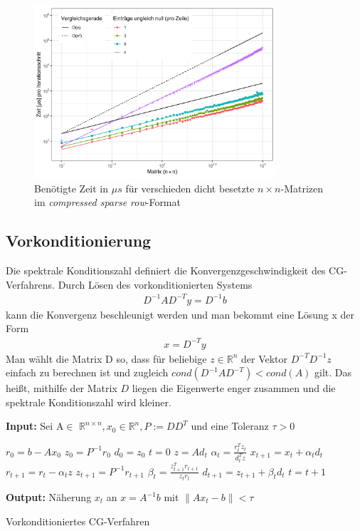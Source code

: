 \documentclass[12pt,a4paper]{scrartcl}
\numberwithin{equation}{section}
\numberwithin{myalgctr}{section}
\numberwithin{mytheoremctr}{subsection}
\numberwithin{mykorollarctr}{subsection}
\numberwithin{mylemmactr}{subsection}
\numberwithin{mybeispielctr}{subsection}
\newcommand\norm[1]{\left\lVert#1\right\rVert}
\begin{document}
	\begin{figure}[H]
		\begin{center}
			\includegraphics[width=0.8\textwidth]{../plots/cg-sparsity-sparse.png}
		\end{center}
		\caption{Ben\"otigte Zeit in $\mu s$ f\"ur verschieden dicht besetzte $n\times n$-Matrizen im \textit{compressed sparse row}-Format}
		\label{fig:zeitcg-sparse}	
	\end{figure}
	
	\subsection{Vorkonditionierung}
	Die spektrale Konditionszahl definiert die Konvergenzgeschwindigkeit des CG-Verfahrens. Durch Lösen des vorkonditionierten Systems
	\begin{align*}
		D^{-1}AD^{-T}y = D^{-1}b
	\end{align*}
	kann die Konvergenz beschleunigt werden und man bekommt eine Lösung x der Form 
	\begin{align*}
		x = D^{-T}y
	\end{align*}
	Man wählt die Matrix D so, dass für beliebige $z \in \mathbb{R}^{n}$ der Vektor $D^{-T}D^{-1}z$ einfach zu berechnen ist und zugleich $cond(D^{-1}AD^{-T}) < cond(A)$ gilt. Das heißt, mithilfe der Matrix $D$ liegen die Eigenwerte enger zusammen und die spektrale Konditionszahl wird kleiner. 
	\begin{algorithm}[H]
		\textbf{Input:} Sei A$\in$ $\mathbb{R}^{n\times n}, x_0 \in \mathbb{R}^{n}, P:=DD^{T}$ und eine Toleranz $\tau > 0$
		\begin{algorithmic}[1]
			\State $r_0 = b - Ax_0$
			\State $z_0 = P^{-1}r_0$
			\State $d_0 = z_0$
			\State $t = 0$
			\While{$ \norm{r_t} > \tau $}
			\State $z = Ad_t$
			\State $\alpha_t = \frac{r_t^{T}z_t}{d_t^{T}z}$
			\State $x_{t+1} = x_{t} + \alpha_t d_t$
			\State $r_{t+1} = r_t - \alpha_t z$
			\State $z_{t+1} = P^{-1}r_{t+1}$
			\State $\beta_t = \frac{z_{t+1}^{T}r_{t+1}}{z_tr_t}$
			\State $d_{t+1} = z_{t+1} + \beta_td_t$
			\State $t = t + 1$
			\EndWhile
		\end{algorithmic}
		\textbf{Output:} Näherung $x_t$ an $x = A^{-1}b$ mit $\norm{Ax_t-b} < \tau$
		
		\caption{Vorkonditioniertes CG-Verfahren} \label{alg:vcg}
	\end{algorithm}
\end{document}
